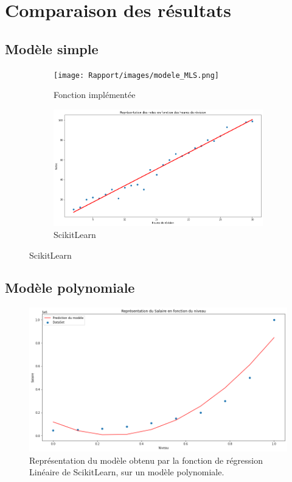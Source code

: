 \documentclass[french]{article}
\begin{document}
\newpage

\section{Comparaison des résultats}

\subsection{Modèle simple}

\begin{figure}[!htbp]
    \centering
    \begin{subfigure}[b]{0.5\textwidth}
         \centering
         \texttt{[image: Rapport/images/modele\_MLS.png]}
         \caption{Fonction implémentée}
        \label{fig:modele_SLLS}
    \end{subfigure}
    \begin{subfigure}[b]{0.5\textwidth}
         \centering
         \includegraphics[width=\textwidth]{Rapport/images/modele_SLLS.png}
         \caption{ScikitLearn}
        \label{fig:modele_SLLS}
    \end{subfigure}
\end{figure}


\subsection{Modèle polynomiale}

\begin{figure}[!htbp]
    \centering
    \includegraphics[width=\textwidth]{Rapport/images/modele_SLLP1.png}
    \caption{Représentation du modèle obtenu par la fonction de régression Linéaire de ScikitLearn, sur un modèle polynomiale.}
    \label{fig:modele_SLLP}
\end{figure}
\end{document}
